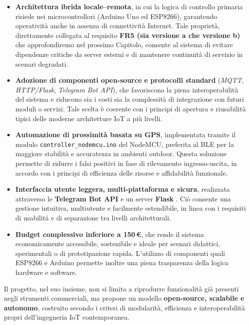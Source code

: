 \begin{itemize}
    \item \textbf{Architettura ibrida locale–remota}, in cui la logica di controllo primaria risiede nei microcontrollori (Arduino Uno ed ESP8266), garantendo operatività anche in assenza di connettività Internet. Tale proprietà, direttamente collegata al requisito \textbf{FR5 (sia versione a che versione b)} che approfondiremo nel prossimo Capitolo, consente al sistema di evitare dipendenze critiche da server esterni e di mantenere continuità di servizio in scenari degradati.

    \item \textbf{Adozione di componenti open-source e protocolli standard} (\textit{MQTT}, \textit{HTTP/Flask}, \textit{Telegram Bot API}), che favoriscono la piena interoperabilità del sistema e riducono sia i costi sia la complessità di integrazione con futuri moduli o servizi. Tale scelta è coerente con i principi di apertura e riusabilità tipici delle moderne architetture IoT a più livelli.

    \item \textbf{Automazione di prossimità basata su GPS}, implementata tramite il modulo \texttt{controller\_nodemcu.ino} del NodeMCU, preferita al BLE per la maggiore stabilità e accuratezza in ambienti outdoor. Questa soluzione permette di ridurre i falsi positivi in fase di rilevamento ingresso-uscita, in accordo con i principi di efficienza delle risorse e affidabilità funzionale.

    \item \textbf{Interfaccia utente leggera, multi-piattaforma e sicura}, realizzata attraverso le \textbf{Telegram Bot API} \cite{TelegramAPI} e un server \textbf{Flask} \cite{Flask2024}. Ciò consente una gestione intuitiva, multiutente e  facilmente estendibile, in linea con i requisiti di usabilità e di separazione tra livelli architetturali.

    \item \textbf{Budget complessivo inferiore a 150\,€}, che rende il sistema economicamente accessibile, sostenibile e ideale per scenari didattici, sperimentali o di prototipazione rapida. L’utilizzo di componenti quali ESP8266 e Arduino permette inoltre una piena trasparenza della logica hardware e software.
\end{itemize}

Il progetto, nel suo insieme, non si limita a riprodurre funzionalità già presenti negli strumenti commerciali, ma propone un modello \textbf{open-source, scalabile e autonomo}, costruito secondo i criteri di modularità, efficienza e interoperabilità propri dell’ingegneria IoT contemporanea.

